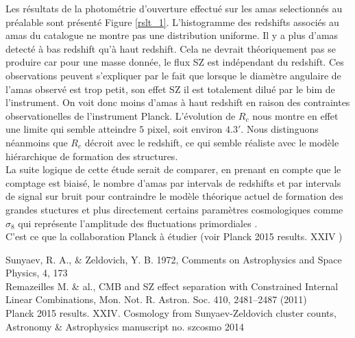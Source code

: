 \documentclass[a4paper,11pt]{article}
\begin{document}
Les résultats de la photométrie d'ouverture effectué sur les amas
selectionnés au préalable sont présenté Figure
\ref{rslt_1}. L'histogramme des redshifts associés au amas du
catalogue ne montre pas une distribution uniforme. Il y a plus
d'amas detecté à bas redshift qu'à haut redshift. Cela ne devrait
théoriquement pas se produire car pour une masse donnée, le flux SZ
est indépendant du redshift. Ces observations peuvent s'expliquer par
le fait que lorsque le diamètre angulaire de l'amas observé est trop
petit, son effet SZ il est totalement dilué par le bim de
l'instrument. On voit donc moins d'amas à haut redshift en raison des
contraintes observationelles de l'instrument Planck. L'évolution de
$R_c$ nous montre en effet une limite qui semble atteindre $5$ pixel,
soit environ $4.3'$. Nous distinguons néanmoins que $R_c$ décroit avec
le redshift, ce qui semble réaliste avec le modèle hiérarchique de
formation des structures. \\

La suite logique de cette étude serait de comparer, en prenant en
compte que le comptage est biaisé, le nombre d'amas par intervals de
redshifts  et par intervals de signal sur bruit pour contraindre le modèle
théorique actuel de formation des grandes stuctures et plus
directement certains paramètres cosmologiques comme $\sigma_8$ qui
représente l'amplitude des fluctuations primordiales
. \\

C'est ce que la collaboration Planck à étudier (voir Planck 2015
results. XXIV \cite{Planck_SZ}) 

\newpage
\begin{thebibliography}{2}

 Sunyaev, R. A., \& Zeldovich, Y. B. 1972, Comments on
  Astrophysics and Space Physics, 4, 173 \\
  
Remazeilles M. \& al., CMB and SZ effect
  separation with Constrained Internal Linear Combinations, 
  Mon. Not. R. Astron. Soc. 410, 2481–2487 (2011)  \\

 Planck 2015 results. XXIV. Cosmology from Sunyaev-Zeldovich
cluster counts, Astronomy \& Astrophysics manuscript no. szcosmo 2014
\end{thebibliography}

\end{document}
